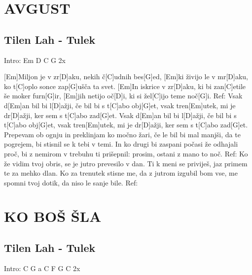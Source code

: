 \documentclass{article}
\begin{document}
	
\tableofcontents
\pagebreak

\begin{multicols}{2}
\section*{AVGUST}
%
\subsection*{Tilen Lah - Tulek}

\begin{guitar}
	Intro: Em D C G 2x 

	[Em]Miljon je v zr[D]aku, nekih č[C]udnih bes[G]ed,
	[Em]ki živijo le v mr[D]aku, ko t[C]oplo sonce zap[G]ušča ta svet.
	[Em]In iskrice v zr[D]aku, ki bi zan[C]etile še moker furn[G]ir,
	[Em]jih netijo oč[D]i, ki si žel[C]ijo teme noč[G]i.
	\linebreak
	Ref:
	Vsak d[Em]an bil bi l[D]ažji, če bil bi s t[C]abo obj[G]et, 
	vsak tren[Em]utek, mi je dr[D]ažji, ker sem s t[C]abo zad[G]et.
	Vsak d[Em]an bil bi l[D]ažji, če bil bi s t[C]abo obj[G]et, 
	vsak tren[Em]utek, mi je dr[D]ažji, ker sem s t[C]abo zad[G]et.
	\linebreak
	Prepevam ob ognju in preklinjam ko močno žari, 
	če le bil bi mal manjši, da te pogrejem, bi stisnil se k tebi v temi.
	In ko drugi bi zaspani počasi že odhajali proč, 
	bi z nemirom v trebuhu ti prišepnil: prosim, ostani z mano to noč.
	\linebreak
	Ref:
	\linebreak
	Ko že vidim tvoj obris, se je jutro prevesilo v dan.
	Ti k meni se priviješ, jaz primem te za mehko dlan.
	Ko za trenutek stisne me, da z jutrom izgubil bom vse,
	me spomni tvoj dotik, da niso le sanje bile.
	\linebreak
	Ref:
\end{guitar}

\pagebreak

\section*{KO BOŠ ŠLA}
%
\subsection*{Tilen Lah - Tulek}
\begin{guitar}
	Intro: C G a C F G C 2x


\end{guitar}
\end{multicols}
\end{document}
